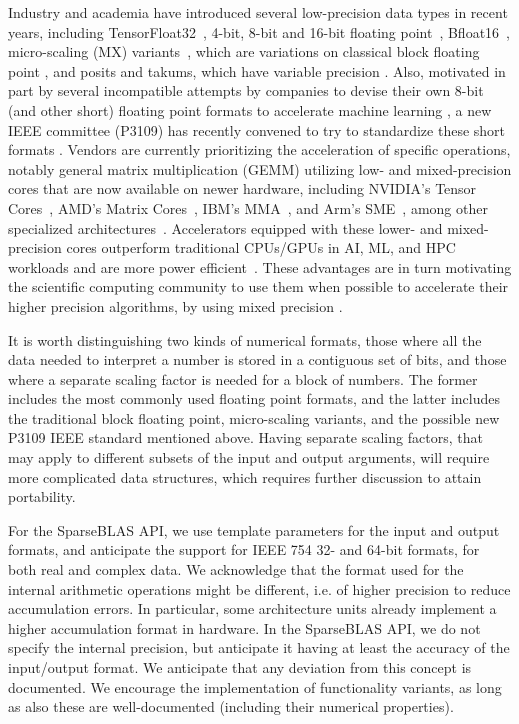 \documentclass[manuscript,review]{acmart}
\begin{document}
Industry and academia have introduced several low-precision data types in recent years, including TensorFloat32~\cite{ampere}, 4-bit, 8-bit and 16-bit floating point~\cite{micikevicius2022fp8}, Bfloat16~\cite{wang2019bfloat16}, micro-scaling (MX) variants~\cite{rouhani2023microscaling}, which are variations
on classical block floating point \cite{Wilkinson63},
and posits and takums, which have variable precision \cite{Posits,GoodBadUgly,hunh24}.
Also, motivated in part by several incompatible attempts by companies to devise their own 8-bit (and other short) floating point formats to accelerate
machine learning
\cite{ocp23a,ocp23b,njjm22,lzwl24,tesla,zdvz22},
a new IEEE committee (P3109) has recently convened to try to
standardize these short formats \cite{P3109}.
Vendors are currently prioritizing the acceleration of specific operations, notably general matrix multiplication (GEMM) utilizing low- and mixed-precision cores that are now available on newer hardware, including NVIDIA's Tensor Cores~\cite{ampere}, 
AMD's Matrix Cores~\cite{amd}, IBM's MMA~\cite{starke2021ibm},
and Arm's SME~\cite{sme}, among other specialized architectures~\cite{NorriePYKLLYJP21,cerebras}.
Accelerators equipped with these lower- and mixed-precision cores outperform traditional CPUs/GPUs in AI, ML, and HPC workloads and are more power efficient~\cite{Atoofian23}.
These advantages are in turn motivating the scientific
computing community to use them when possible to accelerate
their higher precision algorithms, by using mixed precision
\cite{higham2022mixed, haidar2020mixed}.

It is worth distinguishing two kinds of numerical formats,
those where all the data needed to interpret a number
is stored in a contiguous set of bits, and those where a
separate scaling factor is needed for a block of numbers.
The former includes the most commonly used floating point formats,
and the latter includes the traditional block floating point, 
micro-scaling variants, and the possible new P3109 IEEE standard
mentioned above. Having separate scaling factors,
that may apply to different subsets of the input
and output arguments,
will require more complicated data structures, which
requires further discussion to attain portability.

For the SparseBLAS API, we use template parameters for the input and output formats, 
and anticipate the support for IEEE 754 32- and 64-bit formats, for both real and
complex data. We acknowledge that the format used for the internal arithmetic operations
might be different, i.e. of higher precision to reduce accumulation errors. In particular,
some architecture units already implement a higher accumulation format in hardware. 
In the SparseBLAS API, we do not specify the internal precision, but anticipate it having at least the accuracy of the input/output format. We anticipate that any deviation from this concept is documented.
We encourage the implementation of functionality variants,
as long as also these are well-documented (including their numerical properties).
\end{document}
